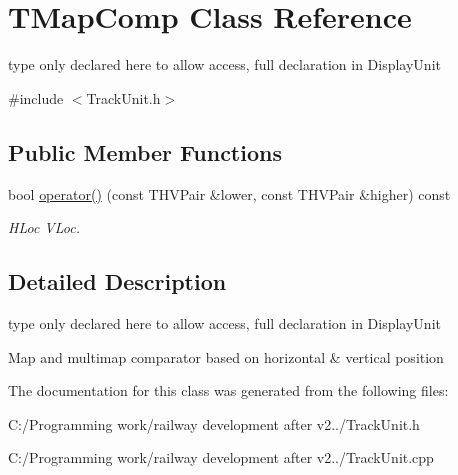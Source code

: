 \hypertarget{class_t_map_comp}{}\section{T\+Map\+Comp Class Reference}
\label{class_t_map_comp}


type only declared here to allow access, full declaration in Display\+Unit  




{\ttfamily \#include $<$Track\+Unit.\+h$>$}

\subsection*{Public Member Functions}
\begin{DoxyCompactItemize}
\item 
\mbox{\label{class_t_map_comp_a6784886eff8452405709d93063d74147}} 
bool \mbox{\hyperlink{class_t_map_comp_a6784886eff8452405709d93063d74147}{operator()}} (const T\+H\+V\+Pair \&lower, const T\+H\+V\+Pair \&higher) const
\begin{DoxyCompactList}\small\item\em H\+Loc V\+Loc. \end{DoxyCompactList}\end{DoxyCompactItemize}


\subsection{Detailed Description}
type only declared here to allow access, full declaration in Display\+Unit 

Map and multimap comparator based on horizontal \& vertical position 

The documentation for this class was generated from the following files\+:\begin{DoxyCompactItemize}
\item 
C\+:/\+Programming work/railway development after v2../Track\+Unit.\+h\item 
C\+:/\+Programming work/railway development after v2../Track\+Unit.\+cpp\end{DoxyCompactItemize}
